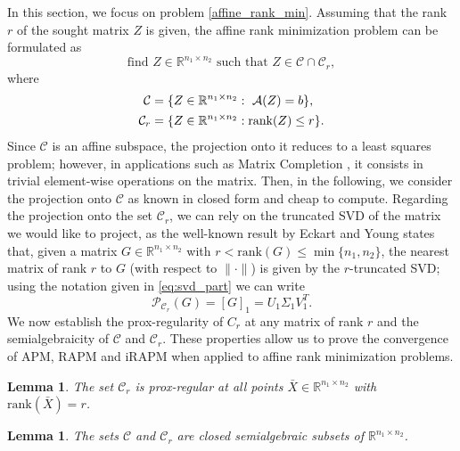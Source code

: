 \documentclass[pdflatex,sn-mathphys-num]{sn-jnl}
\numberwithin{equation}{section}%
\def\R{\mathbb{R}}
\newcommand{\rank}[1]{\textrm{rank}(#1)}
\newcommand{\setRank}{{\mathcal{C}_r}}
\newcommand{\setNorm}{{\mathcal{C} }}
\newcommand{\proj}{\mathcal{P}}
\newcommand{\Tsvd}[1]{[ #1 ]_1}
\theoremstyle{thmstyleone}%
\newtheorem{lemma}[theorem]{Lemma}%
\theoremstyle{thmstyletwo}%
\theoremstyle{thmstylethree}%
\begin{document}
In this section, we focus on problem \eqref{affine_rank_min}. Assuming that the rank $r$ of the sought matrix $Z$ is given, the affine rank minimization problem can be formulated as
\begin{equation}\label{eq:feasibility}
    \text{find }Z\in\R^{n_1\times n_2}\text{ such that }Z\in \setNorm\cap \setRank, 
\end{equation}
where
\begin{align}\label{eq:constraints}
    \setNorm &= \{Z\in \mathbb{R}^{n_1\times n_2}: \ {\cal A}(Z) = b\},\\
    \setRank &= \{Z\in\mathbb{R}^{n_1\times n_2}: \rank{Z}\leq r\}.
\end{align}
Since $\setNorm$ is an affine subspace, the projection onto it reduces to a least squares problem; however, in applications such as Matrix Completion \cite{candes2012exact}, it consists in trivial element-wise operations on the matrix. Then, in the following, we consider the projection onto $\setNorm$ as known in closed form and cheap to compute. Regarding the projection onto the set $\setRank$, we can rely on the truncated SVD of the matrix we would like to project, as the well-known result by Eckart and Young \cite[Theorem 2.4.8]{golub2013matrix} states that, given a matrix $G \in \R^{n_1 \times n_2}$ with $r < \rank{G} \le \min \{ n_1, n_2 \}$, the nearest matrix of rank $r$ to $G$ (with respect to  $\| \cdot \| $) is given by the $r$-truncated SVD; using the notation given in \eqref{eq:svd_part} we can write
\begin{equation}
    \label{eq:proj_rank}
    \proj_\setRank(G) = \Tsvd{G} = U_1 \Sigma_1 V_1^T.
\end{equation}
We now  establish the prox-regularity of $C_r$ at any matrix of rank $r$ and the semialgebraicity of $\mathcal{C} $ and $\mathcal{C}_r$. These properties allow us  to  prove  the  convergence  of APM, RAPM and iRAPM  when applied to affine rank minimization problems. 

\begin{lemma} \label{lemma:prox-regular}\cite[Proposition 3.8]{luke2013prox} 
    The set $\setRank$ is prox-regular at all points $\bar{X}\in\R^{n_1\times n_2}$ with $\rank{\bar{X}} = r $.
\end{lemma}

\begin{lemma}\label{lemma_semialgebrici}
    The sets $\setNorm$ and $\setRank$ are closed semialgebraic subsets of $\R^{n_1\times n_2}$.
\end{lemma}
\end{document}
